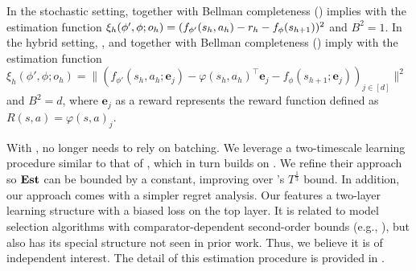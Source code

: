 \begin{lemma}\label{lem: sq assum reduction}
In the stochastic setting,  together with Bellman completeness () implies  with the estimation function
$\xi_{h}(\phi',\phi;o_h)=(f_{\phi'}(s_h,a_h)-r_h-f_{\phi}(s_{h+1}))^2$ and $B^2=1$.  
In the hybrid setting, ,  and  together with Bellman completeness () imply
with the estimation function 
$\xi_h(\phi', \phi;o_h)=\|(f_{\phi'}(s_h,a_h;\bm{e}_j)-\varphi(s_h,a_h)^\top\bm{e}_j - f_{\phi}(s_{h+1};\bm{e}_j))_{j\in[d]}\|^2$ and $B^2=d$, where $\bm{e}_j$ as a reward represents the reward function defined as $R(s,a)=\varphi(s,a)_j$. 
\end{lemma}

With , \postupdate no longer needs to rely on batching. We leverage a two-timescale \postupdate learning procedure similar to that of \cite{foster2024model}, which in turn builds on \cite{agarwal2022non}. We refine their approach so $\textbf{\textup{Est}}$ can be bounded by a constant, improving over \cite{foster2024model}'s $T^{\frac{1}{3}}$ bound. In addition, our approach comes with a simpler regret analysis. Our \postupdate features a two-layer learning structure with a biased loss on the top layer. It is related to model selection algorithms with comparator-dependent second-order bounds (e.g.,  \cite{chen2021impossible}), but also has its special structure not seen in prior work. Thus, we believe it is of independent interest.  The detail of this estimation procedure is provided in .  %


